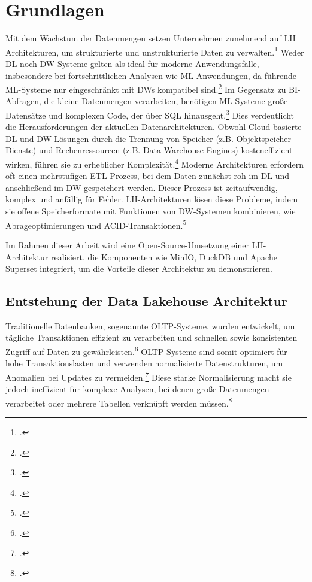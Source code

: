 \chapter{Grundlagen}\label{chapter:Grundlagen}
Mit dem Wachstum der Datenmengen setzen Unternehmen zunehmend auf \ac{LH} Architekturen, um strukturierte und unstrukturierte Daten zu verwalten.\footcite[Vgl.][S. 1]{armbrustLakehouseNewGeneration2021} 
Weder \ac{DL} noch \ac{DW} Systeme gelten als ideal für moderne Anwendungsfälle, insbesondere bei fortschrittlichen Analysen wie \ac{ML} Anwendungen, da führende \ac{ML}-Systeme nur eingeschränkt mit \ac{DW}s kompatibel sind.\footcite[Vgl.][S. 5]{mazumdarDataLakehouseData2023} 
Im Gegensatz zu \ac{BI}-Abfragen, die kleine Datenmengen verarbeiten, benötigen \ac{ML}-Systeme große Datensätze und komplexen Code, der über \ac{SQL} hinausgeht.\footcite[Vgl.][S. 1]{armbrustLakehouseNewGeneration2021}  
Dies verdeutlicht die Herausforderungen der aktuellen Datenarchitekturen. Obwohl Cloud-basierte \ac{DL} und \ac{DW}-Lösungen durch die Trennung von Speicher (z.B. Objektspeicher-Dienste) und Rechenressourcen (z.B. Data Warehouse Engines) kosteneffizient wirken, führen sie zu erheblicher Komplexität.\footcite[Vgl.][S. 5]{mazumdarDataLakehouseData2023} 
Moderne Architekturen erfordern oft einen mehrstufigen \ac{ETL}-Prozess, bei dem Daten zunächst roh im \ac{DL} und anschließend im \ac{DW} gespeichert werden. Dieser Prozess ist zeitaufwendig, komplex und anfällig für Fehler. \ac{LH}-Architekturen lösen diese Probleme, indem sie offene Speicherformate mit Funktionen von \ac{DW}-Systemen kombinieren, wie Abrageoptimierungen und \ac{ACID}-Transaktionen.\footcite[Vgl.][S. 1]{armbrustLakehouseNewGeneration2021} 

Im Rahmen dieser Arbeit wird eine Open-Source-Umsetzung einer \ac{LH}-Architektur realisiert, die Komponenten wie MinIO, DuckDB und Apache Superset integriert, um die Vorteile dieser Architektur zu demonstrieren. 

\section{Entstehung der Data Lakehouse Architektur}
Traditionelle Datenbanken, sogenannte \ac{OLTP}-Systeme, wurden entwickelt, um tägliche Transaktionen effizient zu verarbeiten und schnellen sowie konsistenten Zugriff auf Daten zu gewährleisten.\footcite[Vgl.][45]{vaismanDataWarehouseSystems2014} 
\ac{OLTP}-Systeme sind somit optimiert für hohe Transaktionslasten und verwenden normalisierte Datenstrukturen, um Anomalien bei Updates zu vermeiden.\footcite[Vgl.][45 ff.]{vaismanDataWarehouseSystems2014} 
Diese starke Normalisierung macht sie jedoch ineffizient für komplexe Analysen, bei denen große Datenmengen verarbeitet oder mehrere Tabellen verknüpft werden müssen.\footcite[Vgl.][45 ff.]{vaismanDataWarehouseSystems2014}  

